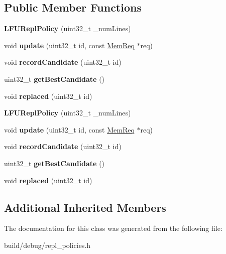 \subsection*{Public Member Functions}
\begin{DoxyCompactItemize}
\item 
\hypertarget{classLFUReplPolicy_a68506220223f68f0e1eb21c957b3ad94}{{\bfseries L\-F\-U\-Repl\-Policy} (uint32\-\_\-t \-\_\-num\-Lines)}\label{classLFUReplPolicy_a68506220223f68f0e1eb21c957b3ad94}

\item 
\hypertarget{classLFUReplPolicy_a50c8903887a1f03cb8cfb80e66ac7b6c}{void {\bfseries update} (uint32\-\_\-t id, const \hyperlink{structMemReq}{Mem\-Req} $\ast$req)}\label{classLFUReplPolicy_a50c8903887a1f03cb8cfb80e66ac7b6c}

\item 
\hypertarget{classLFUReplPolicy_a28c029e034077ddf59962c44e7c30533}{void {\bfseries record\-Candidate} (uint32\-\_\-t id)}\label{classLFUReplPolicy_a28c029e034077ddf59962c44e7c30533}

\item 
\hypertarget{classLFUReplPolicy_ae9d269e859d7cf85fdec6a070e4d4eb8}{uint32\-\_\-t {\bfseries get\-Best\-Candidate} ()}\label{classLFUReplPolicy_ae9d269e859d7cf85fdec6a070e4d4eb8}

\item 
\hypertarget{classLFUReplPolicy_aee2c951c5ea5d9f855466cbfef1f46bf}{void {\bfseries replaced} (uint32\-\_\-t id)}\label{classLFUReplPolicy_aee2c951c5ea5d9f855466cbfef1f46bf}

\item 
\hypertarget{classLFUReplPolicy_a68506220223f68f0e1eb21c957b3ad94}{{\bfseries L\-F\-U\-Repl\-Policy} (uint32\-\_\-t \-\_\-num\-Lines)}\label{classLFUReplPolicy_a68506220223f68f0e1eb21c957b3ad94}

\item 
\hypertarget{classLFUReplPolicy_a50c8903887a1f03cb8cfb80e66ac7b6c}{void {\bfseries update} (uint32\-\_\-t id, const \hyperlink{structMemReq}{Mem\-Req} $\ast$req)}\label{classLFUReplPolicy_a50c8903887a1f03cb8cfb80e66ac7b6c}

\item 
\hypertarget{classLFUReplPolicy_a28c029e034077ddf59962c44e7c30533}{void {\bfseries record\-Candidate} (uint32\-\_\-t id)}\label{classLFUReplPolicy_a28c029e034077ddf59962c44e7c30533}

\item 
\hypertarget{classLFUReplPolicy_ae9d269e859d7cf85fdec6a070e4d4eb8}{uint32\-\_\-t {\bfseries get\-Best\-Candidate} ()}\label{classLFUReplPolicy_ae9d269e859d7cf85fdec6a070e4d4eb8}

\item 
\hypertarget{classLFUReplPolicy_aee2c951c5ea5d9f855466cbfef1f46bf}{void {\bfseries replaced} (uint32\-\_\-t id)}\label{classLFUReplPolicy_aee2c951c5ea5d9f855466cbfef1f46bf}

\end{DoxyCompactItemize}
\subsection*{Additional Inherited Members}


The documentation for this class was generated from the following file\-:\begin{DoxyCompactItemize}
\item 
build/debug/repl\-\_\-policies.\-h\end{DoxyCompactItemize}
